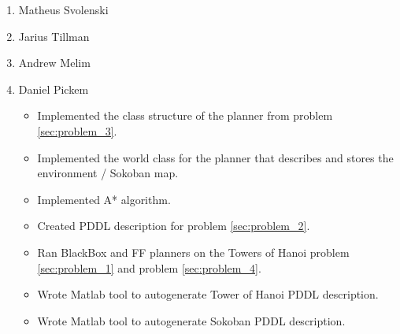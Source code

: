 \documentclass[12pt]{article}
\begin{document}
\begin{enumerate}
  \item Matheus Svolenski
  \item Jarius Tillman
  \item Andrew Melim
  \item Daniel Pickem
    \begin{itemize}
     \item Implemented the class structure of the planner from problem \ref{sec:problem_3}.
     \item Implemented the world class for the planner that describes and stores the environment / Sokoban map.
     \item Implemented A* algorithm.
     \item Created PDDL description for problem \ref{sec:problem_2}.
     \item Ran BlackBox and FF planners on the Towers of Hanoi problem \ref{sec:problem_1} and problem \ref{sec:problem_4}.
     \item Wrote Matlab tool to autogenerate Tower of Hanoi PDDL description.
     \item Wrote Matlab tool to autogenerate Sokoban PDDL description.
    \end{itemize}
\end{enumerate}
\end{document}
